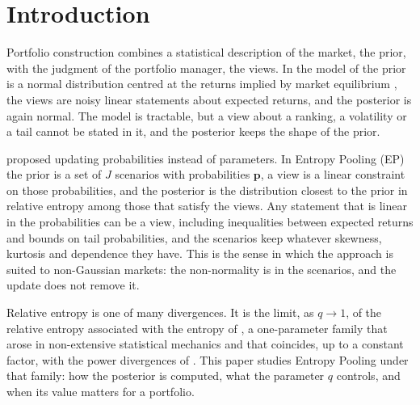 \documentclass[11pt]{article}
\newcommand{\p}{\mathbf{p}}
\begin{document}
\onehalfspacing

\section{Introduction}

Portfolio construction combines a statistical description of the market,
the prior, with the judgment of the portfolio manager, the views. In
the model of \citet{BlackLitterman1992} the prior is a normal distribution
centred at the returns implied by market equilibrium
\citep{HeLitterman2002}, the views are noisy linear statements about
expected returns, and the posterior is again normal. The model is tractable,
but a view about a ranking, a volatility or a tail cannot be stated in it,
and the posterior keeps the shape of the prior.

\citet{Meucci2008} proposed updating probabilities instead of parameters.
In Entropy Pooling (EP) the prior is a set of $J$ scenarios with
probabilities $\p$, a view is a linear constraint on those probabilities,
and the posterior is the distribution closest to the prior in relative
entropy among those that satisfy the views. Any statement that is linear in
the probabilities can be a view, including inequalities between expected
returns and bounds on tail probabilities, and the scenarios keep whatever
skewness, kurtosis and dependence they have. This is the sense in which the
approach is suited to non-Gaussian markets: the non-normality is in the
scenarios, and the update does not remove it.

Relative entropy is one of many divergences. It is the limit, as $q \to 1$,
of the relative entropy associated with the entropy of \citet{Tsallis1988}
\citep{BorlandPlastinoTsallis1998}, a one-parameter family that arose in
non-extensive statistical mechanics \citep{Tsallis2009} and that coincides,
up to a constant factor, with the power divergences of
\citet{CressieRead1984}. This paper studies Entropy Pooling under that
family: how the posterior is computed, what the parameter $q$ controls, and
when its value matters for a portfolio.
\end{document}
